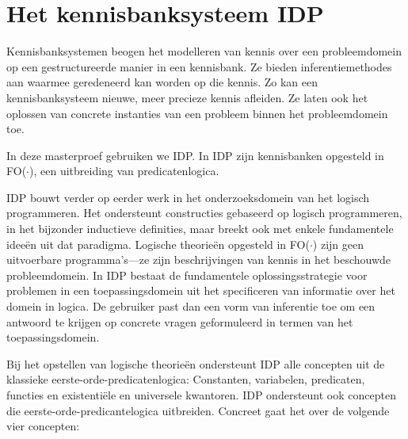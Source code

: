 \section{Het kennisbanksysteem IDP}\label{sec:intro-idp}

Kennisbanksystemen\cite{1999XKSS} beogen het modelleren van kennis over een probleemdomein op een gestructureerde manier in een kennisbank. Ze bieden inferentiemethodes aan waarmee geredeneerd kan worden op die kennis. Zo kan een kennisbanksysteem nieuwe, meer precieze kennis afleiden. Ze laten ook het oplossen van concrete instanties van een probleem binnen het probleemdomein toe.

In deze masterproef gebruiken we IDP\cite{DeCatBroes2014PLaa}. In IDP zijn kennisbanken opgesteld in FO($\cdot$), een uitbreiding van predicatenlogica.

IDP bouwt verder op eerder werk in het onderzoeksdomein van het logisch programmeren. Het ondersteunt constructies gebaseerd op logisch programmeren, in het bijzonder inductieve definities, maar breekt ook met enkele fundamentele idee\"en uit dat paradigma. Logische theorie\"en opgesteld in FO($\cdot$) zijn geen uitvoerbare programma's---ze zijn beschrijvingen van kennis in het beschouwde probleemdomein. In IDP bestaat de fundamentele oplossingsstrategie voor problemen in een toepassingsdomein uit het specificeren van informatie over het domein in logica. De gebruiker past dan een vorm van inferentie toe om een antwoord te krijgen op concrete vragen geformuleerd in termen van het toepassingsdomein.

Bij het opstellen van logische theorie\"en ondersteunt IDP alle concepten uit de klassieke eerste-orde-predicatenlogica: Constanten, variabelen, predicaten, functies en existenti\"ele en universele kwantoren. IDP ondersteunt ook concepten die eerste-orde-predicantelogica uitbreiden. Concreet gaat het over de volgende vier concepten:

